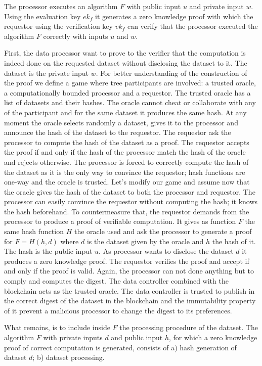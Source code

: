 The processor executes an algorithm $F$ with public input $u$ and private input $w$. Using  the evaluation key $ek_f$ it generates a zero knowledge proof with which the requestor using the verification key $vk_f$ can verify that the processor executed the algorithm $F$ correctly with inputs $u$ and $w$.

First, the data processor want to prove to the verifier that the computation is indeed done on the requested dataset without disclosing the dataset to it. The dataset is the private input $w$. For better understanding of the construction of the proof we define a game where tree participants are involved: a trusted oracle, a  computationally bounded processor and a requestor. The trusted oracle has a list of datasets and their hashes. The oracle cannot cheat or collaborate with any of the participant and for the same dataset it produces the same hash. At any moment the oracle selects randomly a dataset, gives it to the processor and announce the hash of the dataset to the requestor. The requestor ask the processor to compute the hash of the dataset as a proof. The requestor accepts the proof if and only if the hash of the processor match the hash of the oracle and rejects otherwise. The processor is forced to correctly compute the hash of the dataset as it is the only way to convince the requestor; hash functions are one-way and the oracle is trusted. Let's modify our game and assume now that the oracle gives the hash of the dataset to both the processor and requestor. The processor can easily convince the requestor without computing the hash; it knows the hash beforehand. To countermeasure that, the requestor demands from the processor to produce a proof of verifiable computation. It gives as function $F$ the same hash function $H$ the oracle used and ask the processor to generate a proof for $F = H(h, d)$ where $d$ is the dataset given by the oracle and $h$ the hash of it. The hash is the public input $u$. As processor wants to disclose the dataset $d$ it produces a zero knowledge proof. The requestor verifies the proof and accept if and only if the proof is valid. Again, the processor can not done anything but to comply and computes the digest. The data controller combined with the blockchain acts as the trusted oracle. The data controller is trusted to publish in the correct digest of the dataset in the blockchain and the immutability property of it prevent a malicious processor to change the digest to its preferences.

What remains, is to include inside $F$ the processing procedure of the dataset. The algorithm $F$ with private inputs $d$ and public input $h$, for which a zero knowledge proof of correct computation is generated, consists of a) hash generation of dataset $d$; b) dataset processing.

